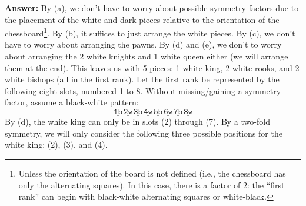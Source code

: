 \documentclass[11pt]{article}
\begin{document}
\noindent \textbf{Answer:} By (a), we don't have to worry about possible symmetry factors due to the placement of the white and dark pieces relative to the orientation of the chessboard\footnote{Unless the orientation of the board is not defined (i.e., the chessboard has only the alternating squares). In this case, there is a factor of $2$: the ``first rank'' can begin with black-white alternating squares or white-black.}. By (b), it suffices to just arrange the white pieces. By (c), we don't have to worry about arranging the pawns. By (d) and (e), we don't to worry about arranging the 2 white knights and 1 white queen either (we will arrange them at the end). This leaves us with 5 pieces: 1 white king, 2 white rooks, and 2 white bishops (all in the first rank). Let the first rank be represented by the following eight slots, numbered 1 to 8. Without missing/gaining a symmetry factor, assume a black-white pattern: 
\begin{equation*}
\underline{\texttt{1b}}\,
\underline{\texttt{2w}}\,
\underline{\texttt{3b}}\,
\underline{\texttt{4w}}\,
\underline{\texttt{5b}}\,
\underline{\texttt{6w}}\,
\underline{\texttt{7b}}\,
\underline{\texttt{8w}}
\end{equation*}
By (d), the white king can only be in slots (2) through (7). By a two-fold symmetry, we will only consider the following three possible positions for the white king: (2), (3), and (4). 
\end{document}
